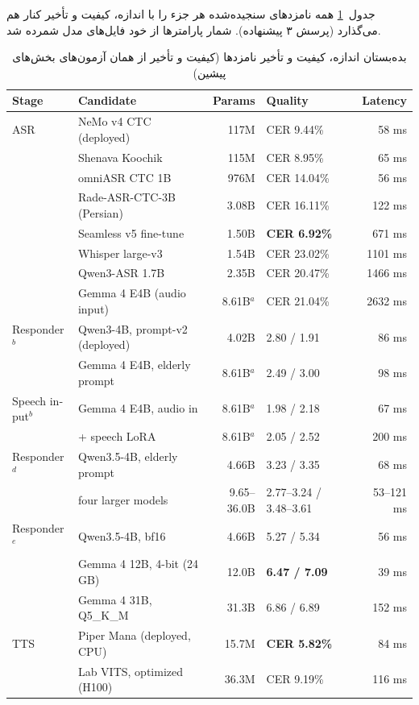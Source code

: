 جدول~\ref{tab:tradeoff} همه نامزدهای سنجیده‌شده هر جزء را با اندازه، کیفیت و
تأخیر کنار هم می‌گذارد (پرسش ۳ پیشنهاده). شمار پارامترها از خود فایل‌های مدل
شمرده شد.

\begin{table}[ht]
\centering
\caption{بده‌بستان اندازه، کیفیت و تأخیر نامزدها (کیفیت و تأخیر از همان
         آزمون‌های بخش‌های پیشین)}
\label{tab:tradeoff}
\small
\setlength{\tabcolsep}{4.5pt}
\begin{latin}
\begin{tabular}{llrlr}
\toprule
Stage & Candidate & Params & Quality & Latency \\
\midrule
ASR & NeMo v4 CTC (deployed) & 117M & CER 9.44\% & 58 ms \\
 & Shenava Koochik & 115M & CER 8.95\% & 65 ms \\
 & omniASR CTC 1B & 976M & CER 14.04\% & 56 ms \\
 & Rade-ASR-CTC-3B (Persian) & 3.08B & CER 16.11\% & 122 ms \\
 & Seamless v5 fine-tune & 1.50B & \textbf{CER 6.92\%} & 671 ms \\
 & Whisper large-v3 & 1.54B & CER 23.02\% & 1101 ms \\
 & Qwen3-ASR 1.7B & 2.35B & CER 20.47\% & 1466 ms \\
 & Gemma 4 E4B (audio input) & 8.61B$^{a}$ & CER 21.04\% & 2632 ms \\
\midrule
Responder$^{b}$ & Qwen3-4B, prompt-v2 (deployed) & 4.02B & 2.80 / 1.91 & 86 ms \\
 & Gemma 4 E4B, elderly prompt & 8.61B$^{a}$ & 2.49 / 3.00 & 98 ms \\
Speech input$^{b}$ & Gemma 4 E4B, audio in & 8.61B$^{a}$ & 1.98 / 2.18 & 67 ms \\
 & + speech LoRA & 8.61B$^{a}$ & 2.05 / 2.52 & 200 ms \\
Responder$^{d}$ & Qwen3.5-4B, elderly prompt & 4.66B & 3.23 / 3.35 & 68 ms \\
 & four larger models & 9.65--36.0B & 2.77--3.24 / 3.48--3.61 & 53--121 ms \\
Responder$^{e}$ & Qwen3.5-4B, bf16 & 4.66B & 5.27 / 5.34 & 56 ms \\
 & Gemma 4 12B, 4-bit (24 GB) & 12.0B & \textbf{6.47 / 7.09} & 39 ms \\
 & Gemma 4 31B, Q5\_K\_M & 31.3B & 6.86 / 6.89 & 152 ms \\
\midrule
TTS & Piper Mana (deployed, CPU) & 15.7M & \textbf{CER 5.82\%} & 84 ms \\
 & Lab VITS, optimized (H100) & 36.3M & CER 9.19\% & 116 ms \\

\end{tabular}
\end{latin}
\end{table}
